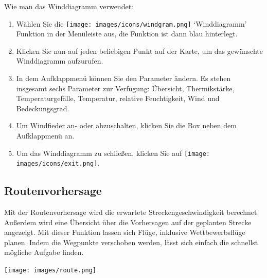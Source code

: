 \documentclass[11pt,a4paper]{article}
\begin{document}
Wie man das Winddiagramm verwendet: 
\begin{enumerate}
\item Wählen Sie die \texttt{[image: images/icons/windgram.png]} `Winddiagramm' Funktion in der Menüleiste aus, die Funktion ist dann blau hinterlegt.
\item Klicken Sie nun auf jeden beliebigen Punkt auf der Karte, um das gewünschte Winddiagramm aufzurufen.
\item In dem Aufklappmenü können Sie den Parameter ändern. Es stehen insgesamt sechs Parameter zur Verfügung: Übersicht, Thermikstärke, Temperaturgefälle, Temperatur, relative Feuchtigkeit, Wind und Bedeckungsgrad.
\item Um Windfieder an- oder abzuschalten, klicken Sie die Box neben dem Aufklappmenü an.
\item Um das Winddiagramm zu schließen, klicken Sie auf \texttt{[image: images/icons/exit.png]}.
\end{enumerate}

\subsection{Routenvorhersage}\label{subsec:routeforecast}
Mit der Routenvorhersage wird die erwartete Streckengeschwindigkeit berechnet. Außerdem wird eine Übersicht über die Vorhersagen auf der geplanten Strecke angezeigt. Mit dieser Funktion lassen sich Flüge, inklusive Wettbewerbsflüge planen. Indem die Wegpunkte verschoben werden, lässt sich einfach die schnellst mögliche Aufgabe finden.
\begin{center}
\texttt{[image: images/route.png]}
\end{center}
\end{document}
